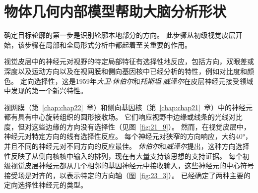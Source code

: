 \section{物体几何内部模型帮助大脑分析形状}

确定目标轮廓的第一步是识别轮廓本地部分的方向。
此步骤从初级视觉皮层开始，该步骤在局部和全局形式分析中都起着至关重要的作用。


视觉皮层中的神经元对视野的特定局部特征有选择性地反应，包括方向，双眼差或深度以及运动方向以及在视网膜和侧向基因核中已经分析的特性，例如对比度和颜色。 
定向选择性，这是1959年\textit{大卫$\cdot$休伯尔}和\textit{托斯坦$\cdot$威泽尔}在皮层神经元接受领域中发现的第一个新兴特性。


视网膜（第~\ref{chap:chap22}~章）和侧向基因核（第~\ref{chap:chap21}~章）中的神经元都有具有中心旋转组织的圆形接收场。
它们响应视野中边缘或线条的光线对比度，但对这些边缘的方向没有选择性（见图~\ref{fig:21_9}）。
然而，在视觉皮层中，神经元对特定方向的线有选择性反应。
每个神经元对狭窄的方向响应，大约40°，并且不同的神经元对不同方向的反应最佳。
\textit{休伯尔}和\textit{威泽尔}提出，这种方向选择性反映了从侧向核核中输入的排列，现在有大量支持该思想的支持证据。
每个初级视觉皮层神经元都从几个相邻的基因神经元中接收输入，这些神经元的中心符号接受场是对齐的，以表示特定的方向轴（图~\ref{fig:23_3}）。
已经确定了两种主要的定向选择性神经元的类型。


